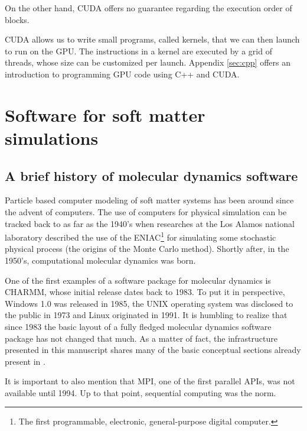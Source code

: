 \documentclass[twoside,openright,titlepage,numbers=noenddot,%
headinclude,footinclude,cleardoublepage=empty,abstract=on,
BCOR=5mm,fontsize=11pt, dvipsnames, paper=b5
]{scrreprt}
\newcommand{\gpu}{\gls{GPU}\xspace}
\begin{document}
On the other hand, CUDA offers no guarantee regarding the execution order of blocks.

CUDA allows us to write small programs, called kernels, that we can then launch to run on the \gpu. The instructions in a kernel are executed by a grid of threads, whose size can be customized per launch. Appendix \ref{sec:cpp} offers an introduction to programming \gpu code using C++ and CUDA.


\section{Software for soft matter simulations}

\subsection*{A brief history of molecular dynamics software}
Particle based computer modeling of soft matter systems has been around since the advent of computers. The use of computers for physical simulation can be tracked back to as far as the 1940's when researches at the Los Alamos national laboratory described the use of the ENIAC\footnote{The first programmable, electronic, general-purpose digital computer.} for simulating some stochastic physical process\cite{Hurd1985} (the origins of the Monte Carlo method\cite{Johansen2010}). Shortly after, in the 1950's, computational molecular dynamics was born\cite{DeTullio2016}.

One of the first examples of a software package for molecular dynamics is CHARMM, whose initial release dates back to 1983\cite{Brooks1983}. To put it in perspective, Windows 1.0 was released in 1985, the UNIX operating system was disclosed to the public in 1973 and Linux originated in 1991. It is humbling to realize that since 1983 the basic layout of a fully fledged molecular dynamics software package has not changed that much. As a matter of fact, the infrastructure presented in this manuscript shares many of the basic conceptual sections already present in \cite{Brooks1983}.

It is important to also mention that MPI, one of the first parallel \glspl{API}, was not available until 1994. Up to that point, sequential computing was the norm.
\end{document}
